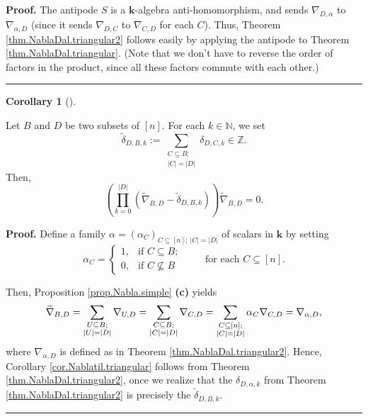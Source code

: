 \documentclass[numbers=enddot,12pt,final,onecolumn,notitlepage]{scrartcl}%
\numberwithin{exer}{subsection}
\theoremstyle{definition}
\newtheorem{coro}[theo]{Corollary}
\newenvironment{corollary}[1][]
{\begin{coro}[#1]\begin{leftbar}}
{\end{leftbar}\end{coro}}
\newenvironment{proof}[1][Proof]{\noindent\textbf{#1.} }{\ \rule{0.5em}{0.5em}}
\let\sumnonlimits\sum
\let\prodnonlimits\prod
\renewcommand{\sum}{\sumnonlimits\limits}
\renewcommand{\prod}{\prodnonlimits\limits}
\begin{document}
\begin{proof}
The antipode $S$ is a $\mathbf{k}$-algebra anti-homomorphism, and sends
$\nabla_{D,\alpha}$ to $\nabla_{\alpha,D}$ (since it sends $\nabla_{D,C}$ to
$\nabla_{C,D}$ for each $C$). Thus, Theorem \ref{thm.NablaDal.triangular2}
follows easily by applying the antipode to Theorem
\ref{thm.NablaDal.triangular}. (Note that we don't have to reverse the order
of factors in the product, since all these factors commute with each other.)
\end{proof}

\begin{corollary}
\label{cor.Nablatil.triangular}Let $B$ and $D$ be two subsets of $\left[
n\right]  $. For each $k\in\mathbb{N}$, we set%
\[
\widetilde{\delta}_{D,B,k}:=\sum_{\substack{C\subseteq B;\\\left\vert
C\right\vert =\left\vert D\right\vert }}\delta_{D,C,k}\in\mathbb{Z}.
\]
Then,%
\[
\left(  \prod_{k=0}^{\left\vert D\right\vert }\left(  \widetilde{\nabla}%
_{B,D}-\widetilde{\delta}_{D,B,k}\right)  \right)  \widetilde{\nabla}%
_{B,D}=0.
\]

\end{corollary}

\begin{proof}
Define a family $\alpha=\left(  \alpha_{C}\right)  _{C\subseteq\left[
n\right]  ;\ \left\vert C\right\vert =\left\vert D\right\vert }$ of scalars in
$\mathbf{k}$ by setting%
\[
\alpha_{C}=%
\begin{cases}
1, & \text{if }C\subseteq B;\\
0, & \text{if }C\not \subseteq B
\end{cases}
\ \ \ \ \ \ \ \ \ \ \text{for each }C\subseteq\left[  n\right]  \text{.}%
\]


Then, Proposition \ref{prop.Nabla.simple} \textbf{(c)} yields
\[
\widetilde{\nabla}_{B,D}=\sum\limits_{\substack{U\subseteq B;\\\left\vert
U\right\vert =\left\vert D\right\vert }}\nabla_{U,D}=\sum
\limits_{\substack{C\subseteq B;\\\left\vert C\right\vert =\left\vert
D\right\vert }}\nabla_{C,D}=\sum\limits_{\substack{C\subseteq\left[  n\right]
;\\\left\vert C\right\vert =\left\vert D\right\vert }}\alpha_{C}\nabla
_{C,D}=\nabla_{\alpha,D},
\]
where $\nabla_{\alpha,D}$ is defined as in Theorem
\ref{thm.NablaDal.triangular2}. Hence, Corollary \ref{cor.Nablatil.triangular}
follows from Theorem \ref{thm.NablaDal.triangular2}, once we realize that the
$\delta_{D,\alpha,k}$ from Theorem \ref{thm.NablaDal.triangular2} is precisely
the $\widetilde{\delta}_{D,B,k}$.
\end{proof}
\end{document}
